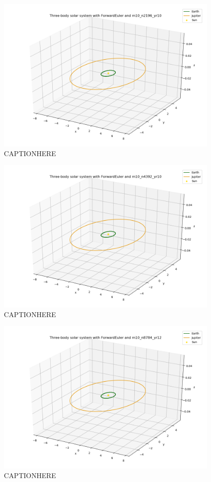 \documentclass{article}
\begin{document}
    \begin{figure}[H]
        \centering
        \includegraphics[width = 11cm]{img/plot3D_S_E_J_F_m10_n2196_yr10.png}
        \caption{CAPTIONHERE}
        \label{fig:plot3D_S_E_J_F_m10_n2196_yr10}
    \end{figure}

    \begin{figure}[H]
        \centering
        \includegraphics[width = 11cm]{img/plot3D_S_E_J_F_m10_n4392_yr10.png}
        \caption{CAPTIONHERE}
        \label{fig:plot3D_S_E_J_F_m10_n4392_yr10}
    \end{figure}

    \begin{figure}[H]
        \centering
        \includegraphics[width = 11cm]{img/plot3D_S_E_J_F_m10_n8784_yr12.png}
        \caption{CAPTIONHERE}
        \label{fig:plot3D_S_E_J_F_m10_n8784_yr12}
    \end{figure}
\end{document}
